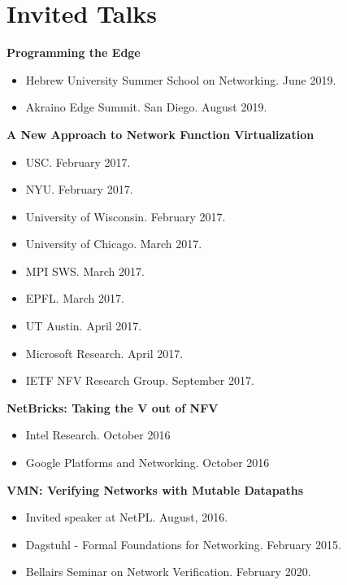 \documentclass[11pt,letterpaper,sans]{moderncv}        %
\begin{document}
\section{Invited Talks}
    \textbf{Programming the Edge}
    \begin{itemize}
        \item Hebrew University Summer School on Networking. June 2019.
        \item Akraino Edge Summit. San Diego. August 2019.
    \end{itemize}
    \textbf{A New Approach to Network Function Virtualization}
    \begin{itemize}
        \item USC. February 2017.
        \item NYU. February 2017.
        \item University of Wisconsin. February 2017.
        \item University of Chicago. March 2017.
        \item MPI SWS. March 2017.
        \item EPFL. March 2017.
        \item UT Austin. April 2017.
        \item Microsoft Research. April 2017.
        \item IETF NFV Research Group. September 2017.
    \end{itemize}
    \textbf{NetBricks: Taking the V out of NFV}
    \begin{itemize}
        \item Intel Research. October 2016
        \item Google Platforms and Networking. October 2016
    \end{itemize}
    \textbf{VMN: Verifying Networks with Mutable Datapaths}
    \begin{itemize}
        \item Invited speaker at NetPL. August, 2016.
        \item Dagstuhl - Formal Foundations for Networking. February 2015.
        \item Bellairs Seminar on Network Verification. February 2020.
    \end{itemize}
\end{document}
